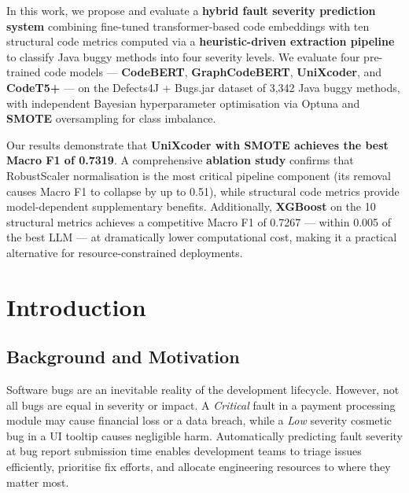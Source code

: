 \documentclass[12pt, a4paper]{report}
\begin{document}
In this work, we propose and evaluate a \textbf{hybrid fault severity prediction system} combining fine-tuned transformer-based code embeddings with ten structural code metrics computed via a \textbf{heuristic-driven extraction pipeline} to classify Java buggy methods into four severity levels. We evaluate four pre-trained code models --- \textbf{CodeBERT}, \textbf{GraphCodeBERT}, \textbf{UniXcoder}, and \textbf{CodeT5+} --- on the Defects4J + Bugs.jar dataset of 3,342 Java buggy methods, with independent Bayesian hyperparameter optimisation via Optuna and \textbf{SMOTE} oversampling for class imbalance.

Our results demonstrate that \textbf{UniXcoder with SMOTE achieves the best Macro F1 of 0.7319}. A comprehensive \textbf{ablation study} confirms that RobustScaler normalisation is the most critical pipeline component (its removal causes Macro F1 to collapse by up to 0.51), while structural code metrics provide model-dependent supplementary benefits. Additionally, \textbf{XGBoost} on the 10 structural metrics achieves a competitive Macro F1 of 0.7267 --- within 0.005 of the best LLM --- at dramatically lower computational cost, making it a practical alternative for resource-constrained deployments.

\clearpage
\tableofcontents
{}
\clearpage
\listoftables
{}

\clearpage
\chapter{Introduction}
\setcounter{page}{7}

\section{Background and Motivation}

Software bugs are an inevitable reality of the development lifecycle. However, not all bugs are equal in severity or impact. A \textit{Critical} fault in a payment processing module may cause financial loss or a data breach, while a \textit{Low} severity cosmetic bug in a UI tooltip causes negligible harm. Automatically predicting fault severity at bug report submission time enables development teams to triage issues efficiently, prioritise fix efforts, and allocate engineering resources to where they matter most.
\end{document}

